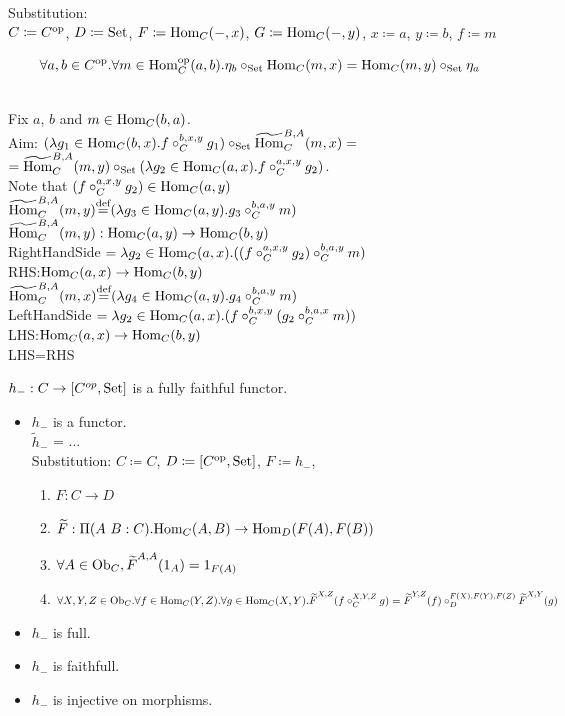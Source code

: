 \documentclass[10pt,a4paper]{article}
\begin{document}
Substitution:\\
$C \coloneqq C^{\textrm{op}}$, $D \coloneqq {\textrm{Set}}$, $F \coloneqq {\textrm{Hom}}_C(-,x)$, $G \coloneqq {\textrm{Hom}}_C(-,y)$, $x \coloneqq a$, $y \coloneqq b$, $f \coloneqq m$
\begin{lemma}
$$\forall a,b\in C^{\textrm{op}}. \forall m\in {\textrm{Hom}}_C^{\textrm{op}} (a,b).\eta_b \circ_{\textrm{Set}} {\textrm{Hom}}_C(m,x)={\textrm{Hom}}_C(m,y)\circ_{\textrm{Set}}\eta_a$$
\end{lemma}
\myprf\\
Fix $a$, $b$ and $m\in{\textrm{Hom}}_C(b,a)$.\\
Aim: $(\lambda g_1 \in {\textrm{Hom}}_C(b,x). f\circ^{b,x,y}_C g_1)\circ_{\textrm{Set}} {\widetilde{{\textrm{Hom}}}\textrm{}}_C^{B,A}(m,x) = $\\
$={\widetilde{{\textrm{Hom}}}\textrm{}}_C^{B,A}(m,y) \circ_{\textrm{Set}} (\lambda g_2 \in {\textrm{Hom}}_C(a,x). f\circ^{a,x,y}_C g_2)$.\\
Note that $(f\circ^{a,x,y}_C g_2) \in {\textrm{Hom}}_C(a,y)$\\
${\widetilde{{\textrm{Hom}}}\textrm{}}_C^{B,A}(m,y) {\stackrel{{\textrm{def}}}{=}} (\lambda g_3 \in {\textrm{Hom}}_C(a,y). g_3\circ^{b,a,y}_C m)$\\
${\widetilde{{\textrm{Hom}}}\textrm{}}_C^{B,A}(m,y) : {\textrm{Hom}}_C(a,y) \to {\textrm{Hom}}_C(b,y)$\\
RightHandSide $= \lambda g_2 \in {\textrm{Hom}}_C(a,x). ((f \circ_C^{a,x,y} g_2) \circ_C^{b,a,y} m )$\\
RHS:${\textrm{Hom}}_C(a,x) \to {\textrm{Hom}}_C(b,y)$\\
${\widetilde{{\textrm{Hom}}}\textrm{}}_C^{B,A}(m,x) {\stackrel{{\textrm{def}}}{=}} (\lambda g_4 \in {\textrm{Hom}}_C(a,y). g_4\circ^{b,a,y}_C m)$\\
LeftHandSide $= \lambda g_2 \in {\textrm{Hom}}_C(a,x). (f \circ_C^{b,x,y} (g_2 \circ_C^{b,a,x} m ))$\\
LHS:${\textrm{Hom}}_C(a,x) \to {\textrm{Hom}}_C(b,y)$\\
LHS=RHS\\
\myqed
\begin{lemma}
$h_{-}:C\rightarrow [C^{op},{\textrm{Set}}]$ is a fully faithful functor.
\end{lemma}
\myprf
\begin{itemize}
\item $h_-$ is a functor.\\
$\widetilde{h}_-$ = ...\\
Substitution: $C\coloneqq C$, $D\coloneqq [C^{\textrm{op}},{\textrm{Set}}]$, $F\coloneqq h_-$,
\begin{enumerate}
\item $F:C \to D$
\item ${\widetilde{F}\textrm{}}:\Pi(A\ B:C).{\textrm{Hom}}_C(A,B) \to {\textrm{Hom}}_D(F(A), F(B))$
\item $\forall A\in {\textrm{Ob}}_C, {\widetilde{F}\textrm{}}^{A,A}(1_A)=1_{F(A)}$
\item $\forall X,Y,Z \in {\textrm{Ob}}_C.\forall f\in{\textrm{Hom}}_C(Y,Z).\forall g\in{\textrm{Hom}}_C(X,Y). {\widetilde{F}\textrm{}}^{X,Z}(f\circ_C^{X,Y,Z} g)={\widetilde{F}\textrm{}}^{Y,Z}(f)\circ_D^{F(X),F(Y),F(Z)} {\widetilde{F}\textrm{}}^{X,Y}(g)$
\end{enumerate}
\item $h_-$ is full.
\item $h_-$ is faithfull.
\item $h_-$ is injective on morphisms.
\end{itemize}
\end{document}
